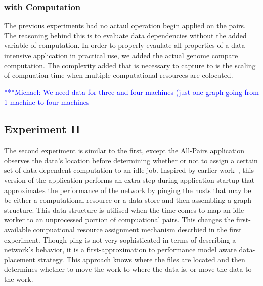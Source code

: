 \documentclass{rspublic}
\newcommand{\micnote}[1]{ {\textcolor{blue} { ***Michael: #1 }}} \else
\newcommand{\jhanote}[1]{} \newcommand{\micnote}[1]{} \newcommand{\fixme}[1]{}
\begin{document}
\subsubsection{with Computation} The previous experiments had no actaul
operation begin applied on the pairs.  The reasoning behind this is to
evaluate data dependencies without the added variable of computation.
In order to properly evaulate all properties of a data-intensive
application in practical use, we added the actual genome compare
computation.  The complexity added that is necessary to capture to is
the scaling of compuation time when multiple computational resources are
colocated.

\jhanote{We need data for compute (comparision) and I/O (only) for
different data-set sizes} \micnote{We need data for three and four
machines (just one graph going from 1 machine to four machines}

\subsection{Experiment II} The second experiment is similar to the
first, except the All-Pairs application observes the data's location
before determining whether or not to assign a certain set of
data-dependent computation to an idle job.  Inspired by earlier
work~\citep{netperf}, this version of the application performs an extra
step during application startup that approximates the performance of the
network by pinging the hosts that may be be either a computational
resource or a data store and then  assembling a graph structure.  This
data structure is utilised when the time comes to map an idle worker to
an unprocessed portion of compuational pairs.  This changes the
first-available compuational resource assignment mechanism descrbied in
the first experiment.  Though ping is not very sophisticated in terms of
describing a network's behavior, it is a first-approximation to
performance model aware data-placement strategy.  This approach knows
where the files are located and then determines whether to move the work
to where the data is, or move the data to the work.  \jhanote{Data-aware
placement is also required, i.e., managing location of files.}  
\end{document}
